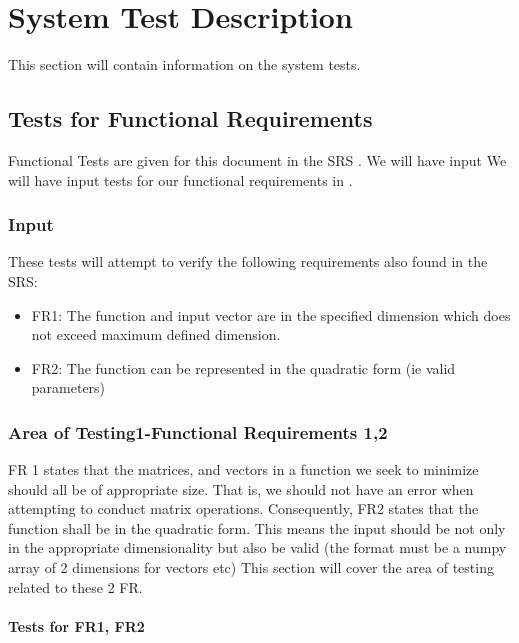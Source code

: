 \documentclass[12pt, titlepage]{article}
\begin{document}
\section{System Test Description}
This section will contain information on the system tests.

\subsection{Tests for Functional Requirements}
Functional Tests are given for this document in the SRS \citep{SRS}. We will have input 
We will have input tests for our functional requirements in \citep{SRS}.

\subsubsection{Input}
These tests will attempt to verify the following requirements also found in the SRS:
\begin{itemize}
  \item FR1: The function and input vector are in the specified dimension which does not exceed
  maximum defined dimension.
  \item FR2: The function can be represented in the quadratic form (ie valid parameters)
\end{itemize}
\subsubsection{Area of Testing1-Functional Requirements 1,2}
FR 1 states that the matrices, and vectors in a function we seek to minimize should all be
of appropriate size. That is, we should not have an error when attempting to conduct matrix 
operations. Consequently, FR2 states that the function shall be in the quadratic form. This means the input should be not only in the appropriate dimensionality but also be valid (the format must be a numpy array of 2 dimensions for vectors etc)  This section will cover the area of testing related to these 2 FR. 

		
\paragraph{Tests for FR1, FR2}
\end{document}
